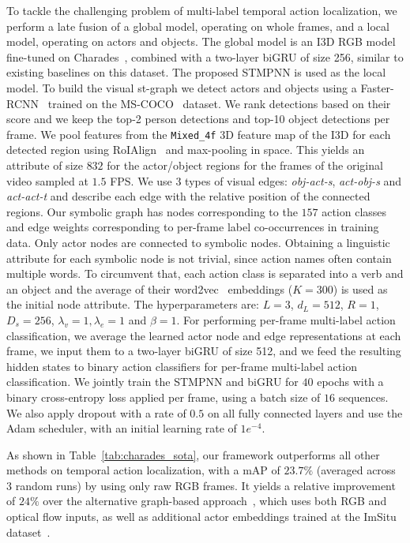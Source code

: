 \documentclass[runningheads]{llncs}
\begin{document}
To tackle the challenging problem of multi-label temporal action localization, we perform a late fusion of a global model, operating on whole frames, and a local model, operating on actors and objects. The global model is an I3D RGB model~\cite{Carreira:CVPR17} fine-tuned on Charades~\cite{Piergiovanni:CVPR18}, combined with a two-layer biGRU of size 256, similar to existing baselines on this dataset. The proposed \ac{STMPNN} is used as the local model.
To build the visual st-graph we detect actors and objects using a Faster-RCNN~\cite{He:TPAMI18} trained on the MS-COCO~\cite{Lin:ECCV14} dataset. We rank detections based on their score and we keep the top-2 person detections and top-10 object detections per frame. 
We pool features from the \texttt{Mixed\_4f} 3D feature map of the I3D for each detected region using RoIAlign~\cite{He:TPAMI18} and max-pooling in space. This yields an attribute of size $832$ for the actor/object regions for the frames of the original video sampled at $1.5$ FPS.
We use $3$ types of visual edges: \emph{obj-act-s}, \emph{act-obj-s} and \emph{act-act-t} and describe each edge with the relative position of the connected regions. Our symbolic graph has nodes corresponding to the $157$ action classes and edge weights corresponding to per-frame label co-occurrences in training data. Only actor nodes are connected to symbolic nodes. Obtaining a linguistic attribute for each symbolic node is not trivial, since action names often contain multiple words. To circumvent that, each action class is separated into a verb and an object and the average of their word2vec~\cite{Mikolov:NIPS13} embeddings ($K=300$) is used as the initial node attribute. 
The hyperparameters are:  $L=3$, $d_L=512$, $R=1$, $D_s=256$, $\lambda_v=1,\lambda_e=1$ and $\beta=1$. For performing per-frame multi-label action classification, we average the learned actor node and edge representations at each frame, we input them to a two-layer biGRU of size 512, and we feed the resulting hidden states to binary action classifiers for per-frame multi-label action classification. We jointly train the \ac{STMPNN} and biGRU for $40$ epochs with a binary cross-entropy loss applied per frame, using a batch size of $16$ sequences. We also apply dropout with a rate of $0.5$ on all fully connected layers and use the Adam scheduler, with an initial learning rate of $1e^{-4}$.

As shown in Table~\ref{tab:charades_sota},
our framework outperforms all other methods on temporal action localization, with a mAP of $\mathbf{23.7}\%$ (averaged across 3 random runs) by using only raw RGB frames. It yields a relative improvement of $24\%$ over the alternative graph-based approach~\cite{Ghosh:WACV20}, which uses both RGB and optical flow inputs, as well as additional actor embeddings trained at the ImSitu dataset~\cite{Yatskar:CVPR16}.
\end{document}
